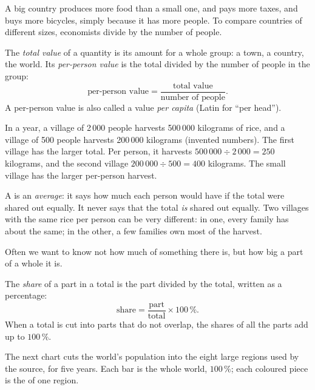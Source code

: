 A big country produces more food than a small one, and pays more taxes, and
buys more bicycles, simply because it has more people. To compare countries
of different sizes, economists divide by the number of people.

\begin{definition}\label{def:g6:reading-economic-charts:per-person}
The \emph{total value} of a quantity is its amount for a
whole group: a town, a country, the world. Its \emph{per-person
value} is the total divided by the number of people
in the group:
\[
  \text{per-person value} = \frac{\text{total value}}{\text{number of people}}.
\]
A per-person value is also called a value \emph{per capita} (Latin for ``per
head'').
\end{definition}

\begin{example}\label{ex:g6:reading-economic-charts:rice}
In a year, a village of 2\,000 people harvests 500\,000 kilograms of rice,
and a village of 500 people harvests 200\,000 kilograms (invented numbers).
The first village has the larger total. Per person, it harvests
$500\,000 \div 2\,000 = 250$ kilograms, and the second village
$200\,000 \div 500 = 400$ kilograms. The small village has the larger
per-person harvest.
\end{example}

A  is an \emph{average}: it says how much each person would
have if the total were shared out equally. It never says that the total
\emph{is} shared out equally. Two villages with the same rice per person can
be very different: in one, every family has about the same; in the other, a
few families own most of the harvest.

Often we want to know not how much of something there is, but how big a part
of a whole it is.

\begin{definition}\label{def:g6:reading-economic-charts:share}
The \emph{share} of a part in a total is the part
divided by the total, written as a percentage:
\[
  \text{share} = \frac{\text{part}}{\text{total}} \times 100\,\%.
\]
When a total is cut into parts that do not overlap, the shares of all the
parts add up to $100\,\%$.
\end{definition}

The next chart cuts the world's population into the eight large regions used
by the source, for five years. Each bar is the whole world, $100\,\%$; each
coloured piece is the  of one region.

